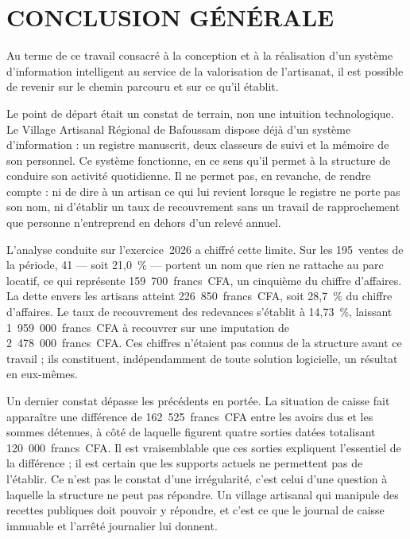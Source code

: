 \chapter*{CONCLUSION GÉNÉRALE}
\label{sec:conclusion}

Au terme de ce travail consacré à la conception et à la réalisation d'un système d'information intelligent au service de la valorisation de l'artisanat, il est possible de revenir sur le chemin parcouru et sur ce qu'il établit.

Le point de départ était un constat de terrain, non une intuition technologique. Le Village Artisanal Régional de Bafoussam dispose déjà d'un système d'information : un registre manuscrit, deux classeurs de suivi et la mémoire de son personnel. Ce système fonctionne, en ce sens qu'il permet à la structure de conduire son activité quotidienne. Il ne permet pas, en revanche, de rendre compte : ni de dire à un artisan ce qui lui revient lorsque le registre ne porte pas son nom, ni d'établir un taux de recouvrement sans un travail de rapprochement que personne n'entreprend en dehors d'un relevé annuel.

L'analyse conduite sur l'exercice~2026 a chiffré cette limite. Sur les 195~ventes de la période, 41 --- soit 21,0~\% --- portent un nom que rien ne rattache au parc locatif, ce qui représente 159~700~francs~CFA, un cinquième du chiffre d'affaires. La dette envers les artisans atteint 226~850~francs~CFA, soit 28,7~\% du chiffre d'affaires. Le taux de recouvrement des redevances s'établit à 14,73~\%, laissant 1~959~000~francs~CFA à recouvrer sur une imputation de 2~478~000~francs~CFA. Ces chiffres n'étaient pas connus de la structure avant ce travail ; ils constituent, indépendamment de toute solution logicielle, un résultat en eux-mêmes.

Un dernier constat dépasse les précédents en portée. La situation de caisse fait apparaître une différence de 162~525~francs~CFA entre les avoirs dus et les sommes détenues, à côté de laquelle figurent quatre sorties datées totalisant 120~000~francs~CFA. Il est vraisemblable que ces sorties expliquent l'essentiel de la différence ; il est certain que les supports actuels ne permettent pas de l'établir. Ce n'est pas le constat d'une irrégularité, c'est celui d'une question à laquelle la structure ne peut pas répondre. Un village artisanal qui manipule des recettes publiques doit pouvoir y répondre, et c'est ce que le journal de caisse immuable et l'arrêté journalier lui donnent.

